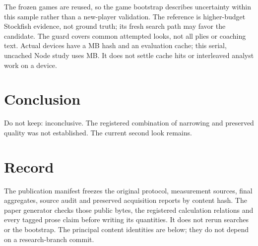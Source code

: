 \documentclass[11pt]{article}
\begin{document}
The frozen games are reused, so the game bootstrap describes uncertainty
within this sample rather than a new-player validation. The reference is
higher-budget Stockfish evidence, not ground truth; its fresh search path
may favor the candidate. The guard covers common attempted looks, not all
plies or coaching text. Actual devices have a \DeviceHashSize{} MB hash and
an evaluation cache; this serial, uncached Node study uses \HashSize{} MB.
It does not settle cache hits or interleaved analyst work on a device.

\section{Conclusion}
Do not keep: inconclusive. The registered combination of narrowing and
preserved quality was not established. The current second look remains.

\section{Record}
The publication manifest freezes the original protocol, measurement sources,
final aggregates, source audit and preserved acquisition reports by content
hash. The paper generator checks those public bytes, the registered
calculation relations and every tagged prose claim before writing its
quantities. It does not rerun searches or the bootstrap. The principal
content identities are below; they do not depend on a research-branch commit.
\ProvenanceTable
\end{document}
